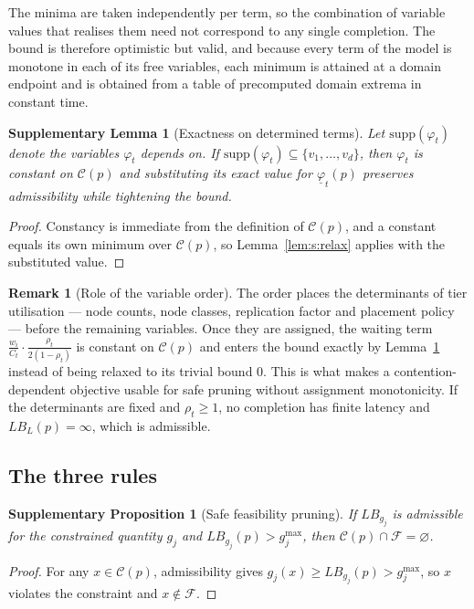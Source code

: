 \documentclass[preprint,11pt,3p]{elsarticle}
\theoremstyle{plain}
\newtheorem{lemma}{Supplementary Lemma}
\newtheorem{proposition}{Supplementary Proposition}
\theoremstyle{definition}
\newtheorem{remark}{Remark}
\newcommand{\C}{\mathcal{C}}
\newcommand{\F}{\mathcal{F}}
\newcommand{\LB}{\mathit{LB}}
\begin{document}
The minima are taken independently per term, so the combination of variable values that
realises them need not correspond to any single completion. The bound is therefore
optimistic but valid, and because every term of the model is monotone in each of its free
variables, each minimum is attained at a domain endpoint and is obtained from a table of
precomputed domain extrema in constant time.

\begin{lemma}[Exactness on determined terms]
\label{lem:s:exact}
Let $\mathrm{supp}(\varphi_t)$ denote the variables $\varphi_t$ depends on. If
$\mathrm{supp}(\varphi_t)\subseteq\{v_1,\dots,v_d\}$, then $\varphi_t$ is constant on
$\C(p)$ and substituting its exact value for $\underline{\varphi}_t(p)$ preserves
admissibility while tightening the bound.
\end{lemma}
\begin{proof}
Constancy is immediate from the definition of $\C(p)$, and a constant equals its own
minimum over $\C(p)$, so Lemma~\ref{lem:s:relax} applies with the substituted value.
\end{proof}

\begin{remark}[Role of the variable order]
The order places the determinants of tier utilisation --- node counts, node classes,
replication factor and placement policy --- before the remaining variables. Once they are
assigned, the waiting term $\frac{w_i}{C_t}\cdot\frac{\rho_t}{2(1-\rho_t)}$ is constant on
$\C(p)$ and enters the bound exactly by Lemma~\ref{lem:s:exact} instead of being relaxed
to its trivial bound $0$. This is what makes a contention-dependent objective usable for
safe pruning without assignment monotonicity. If the determinants are fixed and
$\rho_t\ge1$, no completion has finite latency and $\LB_L(p)=\infty$, which is admissible.
\end{remark}

\subsection*{The three rules}

\begin{proposition}[Safe feasibility pruning]
\label{prop:s:feas}
If $\LB_{g_j}$ is admissible for the constrained quantity $g_j$ and
$\LB_{g_j}(p)>g_j^{\max}$, then $\C(p)\cap\F=\varnothing$.
\end{proposition}
\begin{proof}
For any $x\in\C(p)$, admissibility gives $g_j(x)\ge \LB_{g_j}(p)>g_j^{\max}$, so $x$
violates the constraint and $x\notin\F$.
\end{proof}
\end{document}
